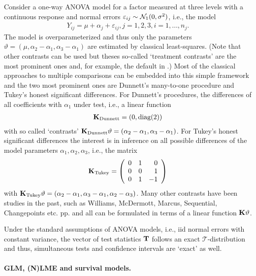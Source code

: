 \documentclass[12pt]{article}
\begin{document}
Consider a one-way ANOVA model for a factor measured at three levels
with a continuous response and normal errors $\varepsilon_{ij} \sim \mathcal{N}_1(0, \sigma^2)$, 
i.e., the model
\begin{eqnarray*}
Y_{ij} = \mu + \alpha_{j} + \varepsilon_{ij}, j = 1, 2, 3, i = 1, \dots, n_j.
\end{eqnarray*}
The model is overparameterized and thus only the parameters
$\vartheta = (\mu, \alpha_2 - \alpha_1, \alpha_3 - \alpha_1)$ are 
estimated by classical least-squares. (Note that other contrasts can be used
but theses so-called `treatment contrasts' are the most prominent ones and,
for example, the default in \RR.) 
Most of the classical approaches
to multiple comparisons can be embedded into this simple framework and 
the two most prominent ones are Dunnett's many-to-one procedure and
Tukey's honest significant differences. For Dunnett's procedures,
the differences of all coefficients with $\alpha_1$ under test, i.e.,
a linear function
\begin{eqnarray*}
\mathbf{K}_\text{Dunnett} = (0, \text{diag}(2))
\end{eqnarray*}
with so called `contrasts' $\mathbf{K}_\text{Dunnett} \vartheta = (\alpha_2 - \alpha_1, \alpha_3 - \alpha_1)$.
For Tukey's honest significant differences the interest is in inference on
all possible differences of the model parameters $\alpha_1, \alpha_2, \alpha_3$, i.e., 
the matrix
\begin{eqnarray*}
\mathbf{K}_\text{Tukey} = \left( 
\begin{array}{rrr} 0 & 1 & 0 \\
0 & 0 & 1 \\
0 & 1 & -1 
\end{array} \right)
\end{eqnarray*}
with $\mathbf{K}_\text{Tukey} \vartheta = (\alpha_2 - \alpha_1, \alpha_3 - \alpha_1, \alpha_2 - \alpha_3)$.
Many other contrasts have been studies in the past, such as Williams, McDermott, Marcus,
Sequential, Changepoints etc. pp.  and all can be formulated in terms
of a linear function $\mathbf{K} \vartheta$.

Under the standard assumptions of ANOVA models, i.e., iid normal errors with constant
variance, the vector of test statistics $\mathbf{T}$ follows an exact $\mathcal{T}$-distribution and
thus, simultaneous tests and confidence intervals are `exact' as well.

\paragraph{GLM, (N)LME and survival models.}
\end{document}
